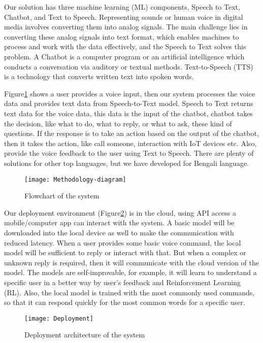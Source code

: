 Our solution has three machine learning (ML) components, Speech to Text, Chatbot, and Text to Speech.
Representing sounds or human voice in digital media involves converting them into analog signals.
The main challenge lies in converting these analog signals into text format, which enables machines to process and work with the data effectively, and the Speech to Text solves this problem\cite{speech-recog-bengali}.
A Chatbot is a computer program or an artificial intelligence which conducts a conversation via auditory or textual methods\cite{chatbot}.
Text-to-Speech (TTS) is a technology that converts written text into spoken words\cite{text-to-speech}.

Figure\ref{fig:methodology} shows a user provides a voice input, then our system processes the voice data and provides text data from Speech-to-Text model.
Speech to Text returns text data for the voice data, this data is the input of the chatbot, chatbot takes the decision, like what to do, what to reply, or what to ask, these kind of questions.
If the response is to take an action based on the output of the chatbot, then it takes the action, like call someone, interaction with IoT devices etc.
Also, provide the voice feedback to the user using Text to Speech.
There are plenty of solutions for other top languages, but we have developed for Bengali language.

\begin{figure}
    \centering
    \texttt{[image: Methodology-diagram]}
    \caption{Flowchart of the system}\label{fig:methodology}
\end{figure}

Our deployment environment (Figure\ref{fig:deployment}) is in the cloud, using API access a mobile/computer app can interact with the system.
A basic model will be downloaded into the local device as well to make the communication with reduced latency.
When a user provides some basic voice command, the local model will be sufficient to reply or interact with that.
But when a complex or unknown reply is required, then it will communicate with the cloud version of the model.
The models are self-improvable, for example, it will learn to understand a specific user in a better way by user's feedback and Reinforcement Learning (RL).
Also, the local model is trained with the most commonly used commands, so that it can respond quickly for the most common words for a specific user.

\begin{figure}
    \centering
    \texttt{[image: Deployment]}
    \caption{Deployment architecture of the system}\label{fig:deployment}
\end{figure}
